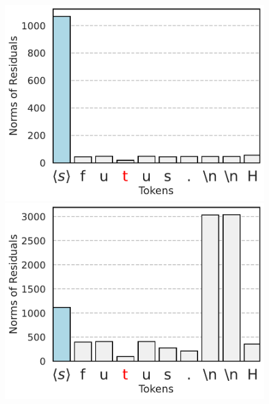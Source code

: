 \begin{figure}[t]
  \centering
  \begin{minipage}{0.3\textwidth}
      \centering
      \vspace{-.2em}
      \includegraphics[width=\linewidth]{Figures/BBM_appendix/norms_layer_0.pdf}
  \end{minipage}
  \begin{minipage}{0.3\textwidth}
      \centering
      \vspace{-.2em}
      \includegraphics[width=\linewidth]{Figures/BBM_appendix/norms_layer_1.pdf}
  \end{minipage}

\end{figure}
